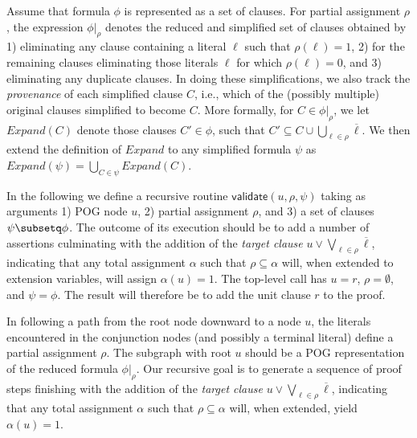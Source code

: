 \documentclass[letterpaper,USenglish,cleveref, autoref, thm-restate]{lipics-v2021}
\newcommand{\obar}[1]{\overline{#1}}
\newcommand{\lit}{\ell}
\newcommand{\assign}{\alpha}
\newcommand{\passign}{\rho}
\newcommand{\validate}{\textsf{validate}}
\newcommand{\simplify}[2]{#1|_{#2}}
\newcommand{\prov}{\mathit{Expand}}
\begin{document}
Assume that formula $\phi$ is 
represented as a set of clauses.
For partial assignment
$\passign$, the expression  $\simplify{\phi}{\passign}$ denotes the
reduced and simplified set of clauses obtained by 1) eliminating any
clause containing a literal $\lit$ such that $\passign(\lit) = 1$,
2) for the remaining clauses eliminating those literals $\lit$ for
which $\passign(\lit) = 0$, and 3) eliminating any duplicate clauses.
In doing these simplifications, we also track the {\em provenance}
of each simplified clause $C$, i.e., which of the (possibly multiple) original clauses simplified to become $C$.
More formally, for $C \in \simplify{\phi}{\passign}$, we let $\prov(C)$ denote
those clauses $C' \in \phi$, such that
$C' \subseteq C \cup \bigcup_{\lit \in \passign} \obar{\lit}$.
We then extend the definition of $\prov$ to any simplified formula
$\psi$ as $\prov(\psi) = \bigcup_{C \in \psi} \prov(C)$.

In the following we define a recursive routine $\validate(u, \passign,
\psi)$ taking as arguments 1) POG node $u$, 2) partial assignment
$\passign$, and 3) a set of clauses $\psi \subsetq \phi$.  The outcome of its execution should be to add a number of assertions culminating with
the addition of the {\em target clause}
$u \lor \bigvee_{\lit \in \passign} \obar{\lit}$, indicating that any total
assignment $\assign$ such that $\passign \subseteq \assign$
will, when extended to extension variables, will assign $\assign(u) = 1$.
The top-level call has $u = r$, $\passign = \emptyset$, and $\psi = \phi$.  The result will therefore be to add the unit clause $r$ to the proof.

In following a path from the root node downward to a node $u$, the
literals encountered in the conjunction nodes (and possibly a terminal
literal) define a partial assignment $\passign$.  The subgraph with
root $u$ should be a POG representation of the reduced formula
$\simplify{\phi}{\passign}$.  Our recursive goal is to generate
a sequence of proof steps finishing with the addition of the {\em target clause}
$u \lor \bigvee_{\lit \in \passign} \obar{\lit}$, indicating that any total
assignment $\assign$ such that $\passign \subseteq \assign$ will, when extended, yield
$\alpha(u) = 1$.
\end{document}
